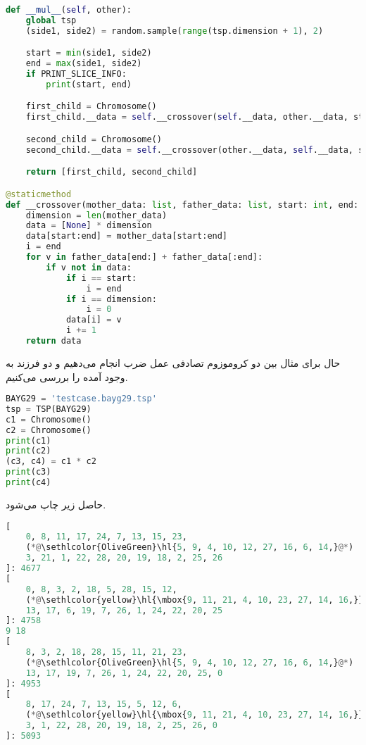 \documentclass[a4paper, 12pt]{article}
\theoremstyle{definition}
\begin{document}
\LTR
\begin{lstlisting}[language=Python]
def __mul__(self, other):
    global tsp
    (side1, side2) = random.sample(range(tsp.dimension + 1), 2)

    start = min(side1, side2)
    end = max(side1, side2)
    if PRINT_SLICE_INFO:
        print(start, end)

    first_child = Chromosome()
    first_child.__data = self.__crossover(self.__data, other.__data, start, end)

    second_child = Chromosome()
    second_child.__data = self.__crossover(other.__data, self.__data, start, end)

    return [first_child, second_child]

@staticmethod
def __crossover(mother_data: list, father_data: list, start: int, end: int):
    dimension = len(mother_data)
    data = [None] * dimension
    data[start:end] = mother_data[start:end]
    i = end
    for v in father_data[end:] + father_data[:end]:
        if v not in data:
            if i == start:
                i = end
            if i == dimension:
                i = 0
            data[i] = v
            i += 1
    return data
\end{lstlisting}
\RTL

حال برای مثال بین دو کروموزوم تصادفی عمل ضرب انجام می‌دهیم و دو فرزند به وجود آمده را بررسی می‌کنیم.

\LTR
\begin{lstlisting}[language=Python]
BAYG29 = 'testcase.bayg29.tsp'
tsp = TSP(BAYG29)
c1 = Chromosome()
c2 = Chromosome()
print(c1)
print(c2)
(c3, c4) = c1 * c2
print(c3)
print(c4)
\end{lstlisting}
\RTL

حاصل زیر چاپ می‌شود.

\LTR
\begin{lstlisting}[language=Python]
[
    0, 8, 11, 17, 24, 7, 13, 15, 23,
    (*@\sethlcolor{OliveGreen}\hl{5, 9, 4, 10, 12, 27, 16, 6, 14,}@*)
    3, 21, 1, 22, 28, 20, 19, 18, 2, 25, 26
]: 4677
[
    0, 8, 3, 2, 18, 5, 28, 15, 12,
    (*@\sethlcolor{yellow}\hl{\mbox{9, 11, 21, 4, 10, 23, 27, 14, 16,}}@*)
    13, 17, 6, 19, 7, 26, 1, 24, 22, 20, 25
]: 4758
9 18
[
    8, 3, 2, 18, 28, 15, 11, 21, 23,
    (*@\sethlcolor{OliveGreen}\hl{5, 9, 4, 10, 12, 27, 16, 6, 14,}@*)
    13, 17, 19, 7, 26, 1, 24, 22, 20, 25, 0
]: 4953
[
    8, 17, 24, 7, 13, 15, 5, 12, 6,
    (*@\sethlcolor{yellow}\hl{\mbox{9, 11, 21, 4, 10, 23, 27, 14, 16,}}@*)
    3, 1, 22, 28, 20, 19, 18, 2, 25, 26, 0
]: 5093    
\end{lstlisting}
\RTL
\end{document}
